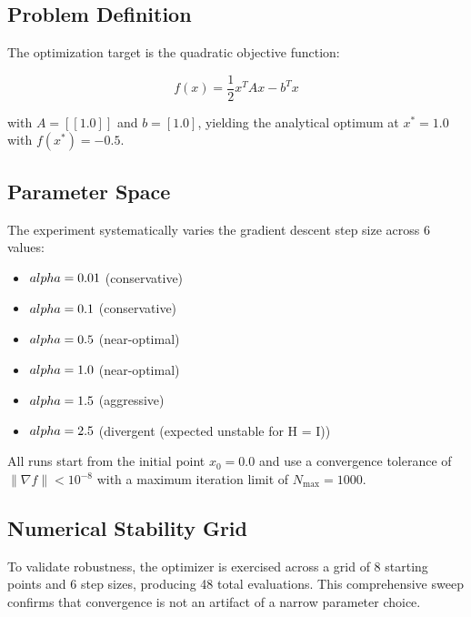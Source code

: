 \documentclass[
]{article}
\providecommand{\tightlist}{%
  \setlength{\itemsep}{0pt}\setlength{\parskip}{0pt}}
\begin{document}
\subsection{Problem Definition}\label{problem-definition}

The optimization target is the quadratic objective function:

\begin{equation}
\label{eq:quadratic_objective}
f(x) = \frac{1}{2} x^T A x - b^T x
\end{equation}

with \(A = [[1.0]]\) and \(b = [1.0]\), yielding the analytical optimum
at \(x^* = 1.0\) with \(f(x^*) = -0.5\).

\subsection{Parameter Space}\label{parameter-space}

The experiment systematically varies the gradient descent step size
across 6 values:

\begin{itemize}
\tightlist
\item
  \(\\alpha = 0.01\) (conservative)
\item
  \(\\alpha = 0.1\) (conservative)
\item
  \(\\alpha = 0.5\) (near-optimal)
\item
  \(\\alpha = 1.0\) (near-optimal)
\item
  \(\\alpha = 1.5\) (aggressive)
\item
  \(\\alpha = 2.5\) (divergent (expected unstable for H = I))
\end{itemize}

All runs start from the initial point \(x_0 = 0.0\) and use a
convergence tolerance of \(\|{\nabla f}\| < 10^{-8}\) with a maximum
iteration limit of \(N_{\max} = 1000\).

\subsection{Numerical Stability Grid}\label{numerical-stability-grid}

To validate robustness, the optimizer is exercised across a grid of 8
starting points and 6 step sizes, producing 48 total evaluations. This
comprehensive sweep confirms that convergence is not an artifact of a
narrow parameter choice.
\end{document}
